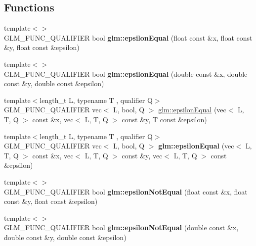 \subsection*{Functions}
\begin{DoxyCompactItemize}
\item 
\mbox{\label{epsilon_8inl_aded5e7ea9a0eacd03367ad77986c2a15}} 
{\footnotesize template$<$$>$ }\\G\+L\+M\+\_\+\+F\+U\+N\+C\+\_\+\+Q\+U\+A\+L\+I\+F\+I\+ER bool {\bfseries glm\+::epsilon\+Equal} (float const \&x, float const \&y, float const \&epsilon)
\item 
\mbox{\label{epsilon_8inl_a6e30ea38a0e3ebc25d87e667255057e5}} 
{\footnotesize template$<$$>$ }\\G\+L\+M\+\_\+\+F\+U\+N\+C\+\_\+\+Q\+U\+A\+L\+I\+F\+I\+ER bool {\bfseries glm\+::epsilon\+Equal} (double const \&x, double const \&y, double const \&epsilon)
\item 
{\footnotesize template$<$length\+\_\+t L, typename T , qualifier Q$>$ }\\G\+L\+M\+\_\+\+F\+U\+N\+C\+\_\+\+Q\+U\+A\+L\+I\+F\+I\+ER vec$<$ L, bool, Q $>$ \hyperlink{group__gtc__epsilon_ga91b417866cafadd076004778217a1844}{glm\+::epsilon\+Equal} (vec$<$ L, T, Q $>$ const \&x, vec$<$ L, T, Q $>$ const \&y, T const \&epsilon)
\item 
\mbox{\label{epsilon_8inl_a64e220eeafcda3b82fe986e3ce0eac03}} 
{\footnotesize template$<$length\+\_\+t L, typename T , qualifier Q$>$ }\\G\+L\+M\+\_\+\+F\+U\+N\+C\+\_\+\+Q\+U\+A\+L\+I\+F\+I\+ER vec$<$ L, bool, Q $>$ {\bfseries glm\+::epsilon\+Equal} (vec$<$ L, T, Q $>$ const \&x, vec$<$ L, T, Q $>$ const \&y, vec$<$ L, T, Q $>$ const \&epsilon)
\item 
\mbox{\label{epsilon_8inl_af4127d65f4afc6e447d461bae25f90fe}} 
{\footnotesize template$<$$>$ }\\G\+L\+M\+\_\+\+F\+U\+N\+C\+\_\+\+Q\+U\+A\+L\+I\+F\+I\+ER bool {\bfseries glm\+::epsilon\+Not\+Equal} (float const \&x, float const \&y, float const \&epsilon)
\item 
\mbox{\label{epsilon_8inl_a68d8ce38812c8599018e404afc79f088}} 
{\footnotesize template$<$$>$ }\\G\+L\+M\+\_\+\+F\+U\+N\+C\+\_\+\+Q\+U\+A\+L\+I\+F\+I\+ER bool {\bfseries glm\+::epsilon\+Not\+Equal} (double const \&x, double const \&y, double const \&epsilon)

\end{DoxyCompactItemize}
